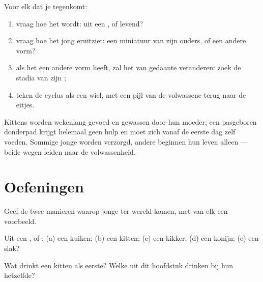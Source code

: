 \begin{method}\label{met:g2:animals-grow-up:read}
Voor elk  dat je tegenkomt:
\begin{enumerate}
  \item vraag hoe het  wordt: uit een , of levend?
  \item vraag hoe het jong eruitziet: een miniatuur van zijn ouders, of
        een andere vorm?
  \item als het een andere vorm heeft, zal het van gedaante veranderen:
        zoek de stadia van zijn ;
  \item teken de cyclus als een wiel, met een pijl van de volwassene
        terug naar de eitjes.
\end{enumerate}
\end{method}

\begin{remark}\label{rem:g2:animals-grow-up:care}
Kittens worden wekenlang gevoed en gewassen door hun moeder; een
pasgeboren donderpad krijgt helemaal geen hulp en moet zich vanaf de
eerste dag zelf voeden. Sommige jonge  worden verzorgd, andere
beginnen hun leven alleen --- beide wegen leiden naar de volwassenheid.
\end{remark}

\section{Oefeningen}

\begin{exercise}[$\star$]\label{exo:g2:animals-grow-up:1}
Geef de twee manieren waarop jonge  ter wereld komen, met van elk
een voorbeeld.
\end{exercise}

\begin{exercise}[$\star$]\label{exo:g2:animals-grow-up:2}
Uit een , of : (a) een kuiken; (b) een kitten; (c) een
kikker; (d) een konijn; (e) een slak?
\end{exercise}

\begin{exercise}[$\star$]\label{exo:g2:animals-grow-up:3}
Wat drinkt een kitten als eerste? Welke  uit dit hoofdstuk
drinken bij hun  hetzelfde?
\end{exercise}

